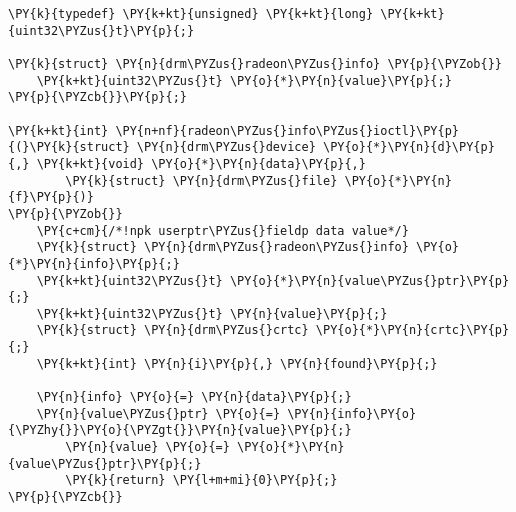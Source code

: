\begin{Verbatim}[commandchars=\\\{\}]
\PY{k}{typedef} \PY{k+kt}{unsigned} \PY{k+kt}{long} \PY{k+kt}{uint32\PYZus{}t}\PY{p}{;}

\PY{k}{struct} \PY{n}{drm\PYZus{}radeon\PYZus{}info} \PY{p}{\PYZob{}}
    \PY{k+kt}{uint32\PYZus{}t} \PY{o}{*}\PY{n}{value}\PY{p}{;}
\PY{p}{\PYZcb{}}\PY{p}{;}

\PY{k+kt}{int} \PY{n+nf}{radeon\PYZus{}info\PYZus{}ioctl}\PY{p}{(}\PY{k}{struct} \PY{n}{drm\PYZus{}device} \PY{o}{*}\PY{n}{d}\PY{p}{,} \PY{k+kt}{void} \PY{o}{*}\PY{n}{data}\PY{p}{,}
        \PY{k}{struct} \PY{n}{drm\PYZus{}file} \PY{o}{*}\PY{n}{f}\PY{p}{)}
\PY{p}{\PYZob{}}
	\PY{c+cm}{/*!npk userptr\PYZus{}fieldp data value*/}
	\PY{k}{struct} \PY{n}{drm\PYZus{}radeon\PYZus{}info} \PY{o}{*}\PY{n}{info}\PY{p}{;}
	\PY{k+kt}{uint32\PYZus{}t} \PY{o}{*}\PY{n}{value\PYZus{}ptr}\PY{p}{;}
	\PY{k+kt}{uint32\PYZus{}t} \PY{n}{value}\PY{p}{;}
	\PY{k}{struct} \PY{n}{drm\PYZus{}crtc} \PY{o}{*}\PY{n}{crtc}\PY{p}{;}
	\PY{k+kt}{int} \PY{n}{i}\PY{p}{,} \PY{n}{found}\PY{p}{;}

	\PY{n}{info} \PY{o}{=} \PY{n}{data}\PY{p}{;}
	\PY{n}{value\PYZus{}ptr} \PY{o}{=} \PY{n}{info}\PY{o}{\PYZhy{}}\PY{o}{\PYZgt{}}\PY{n}{value}\PY{p}{;}
        \PY{n}{value} \PY{o}{=} \PY{o}{*}\PY{n}{value\PYZus{}ptr}\PY{p}{;}
        \PY{k}{return} \PY{l+m+mi}{0}\PY{p}{;}
\PY{p}{\PYZcb{}}
\end{Verbatim}
